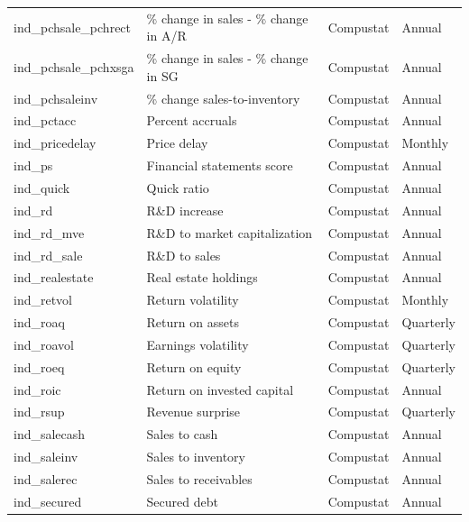 \documentclass{article}
\begin{document}
\begin{center}
\begin{longtable}{llll}
			ind\_pchsale\_pchrect\footnotemark[\value{footnote}] & \% change in sales - \% change in A/R & Compustat & Annual \\
			ind\_pchsale\_pchxsga\footnotemark[\value{footnote}] & \% change in sales - \% change in SG & Compustat & Annual \\
			ind\_pchsaleinv\footnotemark[\value{footnote}] & \% change sales-to-inventory & Compustat & Annual \\
			ind\_pctacc\footnotemark[\value{footnote}] & Percent accruals & Compustat & Annual \\
			ind\_pricedelay & Price delay & Compustat & Monthly \\
			ind\_ps & Financial statements score & Compustat & Annual \\
			ind\_quick & Quick ratio & Compustat & Annual \\
			ind\_rd & R\&D increase & Compustat & Annual \\
			ind\_rd\_mve\footnotemark[\value{footnote}] & R\&D to market capitalization & Compustat & Annual \\
			ind\_rd\_sale\footnotemark[\value{footnote}] & R\&D to sales & Compustat & Annual \\
			ind\_realestate\footnotemark[\value{footnote}] & Real estate holdings & Compustat & Annual \\
			ind\_retvol & Return volatility & Compustat & Monthly \\
			ind\_roaq & Return on assets & Compustat & Quarterly \\
			ind\_roavol\footnotemark[\value{footnote}] & Earnings volatility & Compustat & Quarterly \\
			ind\_roeq & Return on equity & Compustat & Quarterly \\
			ind\_roic & Return on invested capital & Compustat & Annual \\
			ind\_rsup & Revenue surprise & Compustat & Quarterly \\
			ind\_salecash & Sales to cash & Compustat & Annual \\
			ind\_saleinv\footnotemark[\value{footnote}] & Sales to inventory & Compustat & Annual \\
			ind\_salerec & Sales to receivables & Compustat & Annual \\
			ind\_secured\footnotemark[\value{footnote}] & Secured debt & Compustat & Annual \\

\end{longtable}
\end{center}
\end{document}
